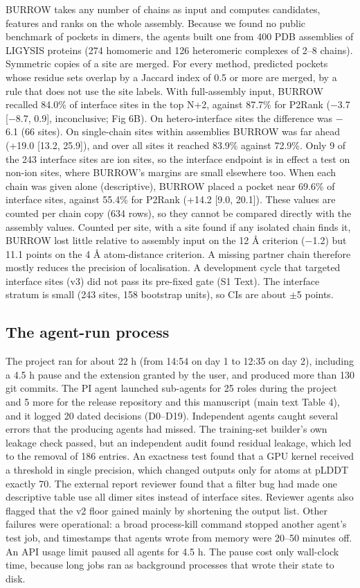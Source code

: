 \documentclass[10pt,letterpaper]{article}
\begin{document}
BURROW takes any number of chains as input and computes candidates, features and ranks on the whole assembly. Because we found no public benchmark of pockets in dimers, the agents built one from 400 PDB assemblies of LIGYSIS proteins (274 homomeric and 126 heteromeric complexes of 2--8 chains). Symmetric copies of a site are merged. For every method, predicted pockets whose residue sets overlap by a Jaccard index of 0.5 or more are merged, by a rule that does not use the site labels. With full-assembly input, BURROW recalled 84.0\% of interface sites in the top N+2, against 87.7\% for P2Rank ($-$3.7 [$-$8.7, 0.9], inconclusive; Fig 6B). On hetero-interface sites the difference was $-$6.1 (66 sites). On single-chain sites within assemblies BURROW was far ahead (+19.0 [13.2, 25.9]), and over all sites it reached 83.9\% against 72.9\%. Only 9 of the 243 interface sites are ion sites, so the interface endpoint is in effect a test on non-ion sites, where BURROW's margins are small elsewhere too. When each chain was given alone (descriptive), BURROW placed a pocket near 69.6\% of interface sites, against 55.4\% for P2Rank (+14.2 [9.0, 20.1]). These values are counted per chain copy (634 rows), so they cannot be compared directly with the assembly values. Counted per site, with a site found if any isolated chain finds it, BURROW lost little relative to assembly input on the 12 \AA{} criterion ($-$1.2) but 11.1 points on the 4 \AA{} atom-distance criterion. A missing partner chain therefore mostly reduces the precision of localisation. A development cycle that targeted interface sites (v3) did not pass its pre-fixed gate (S1 Text). The interface stratum is small (243 sites, 158 bootstrap units), so CIs are about $\pm$5 points.

\subsection*{The agent-run process}

The project ran for about 22 h (from 14:54 on day 1 to 12:35 on day 2), including a 4.5 h pause and the extension granted by the user, and produced more than 130 git commits. The PI agent launched sub-agents for 25 roles during the project and 5 more for the release repository and this manuscript (main text Table 4), and it logged 20 dated decisions (D0--D19). Independent agents caught several errors that the producing agents had missed. The training-set builder's own leakage check passed, but an independent audit found residual leakage, which led to the removal of 186 entries. An exactness test found that a GPU kernel received a threshold in single precision, which changed outputs only for atoms at pLDDT exactly 70. The external report reviewer found that a filter bug had made one descriptive table use all dimer sites instead of interface sites. Reviewer agents also flagged that the v2 floor gained mainly by shortening the output list. Other failures were operational: a broad process-kill command stopped another agent's test job, and timestamps that agents wrote from memory were 20--50 minutes off. An API usage limit paused all agents for 4.5 h. The pause cost only wall-clock time, because long jobs ran as background processes that wrote their state to disk.
\end{document}
